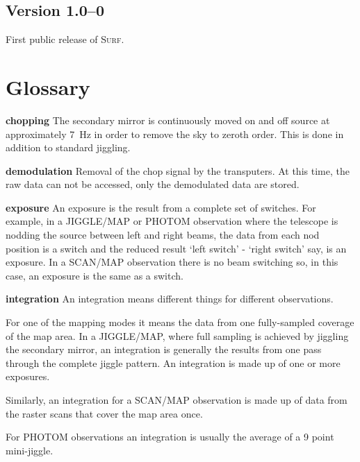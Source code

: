 \documentclass[twoside,11pt]{starlink}
\providecommand{\scusoft}          {\textsc{Surf}}
\begin{document}
\subsection{Version 1.0--0}

First public release of \scusoft.


\clearpage

\section*{Glossary\label{glossary}}

\begin{description}

\item{\textbf{chopping}} The secondary mirror is continuously moved on and off
source at approximately 7~Hz in order to remove the sky to zeroth order. This
is done in addition to standard jiggling.

\item{\textbf{demodulation}} Removal of the chop signal by the transputers.
At this time, the raw data can not be accessed, only the demodulated data are
stored.

\item{\textbf{exposure}} An exposure is the result from a complete set of
switches. For example, in a JIGGLE/MAP or PHOTOM observation where the
telescope is nodding the source between left and right beams, the data from
each nod position is a switch and the reduced result `left switch' - `right
switch' say, is an exposure. In a SCAN/MAP observation there is no beam
switching so, in this case, an exposure is the same as a switch.


\item{\textbf{integration}} An integration means different things for different
observations.

For one of the mapping modes it means the data from one fully-sampled coverage
of the map area. In a JIGGLE/MAP, where full sampling is achieved by jiggling
the secondary mirror, an integration is generally the results from one pass
through the complete jiggle pattern. An integration is made up of one or more
exposures.

Similarly, an integration for a SCAN/MAP observation is made up of data from
the raster scans that cover the map area once.

For PHOTOM observations an integration is usually the average of a 9 point
mini-jiggle.


\end{description}
\end{document}

